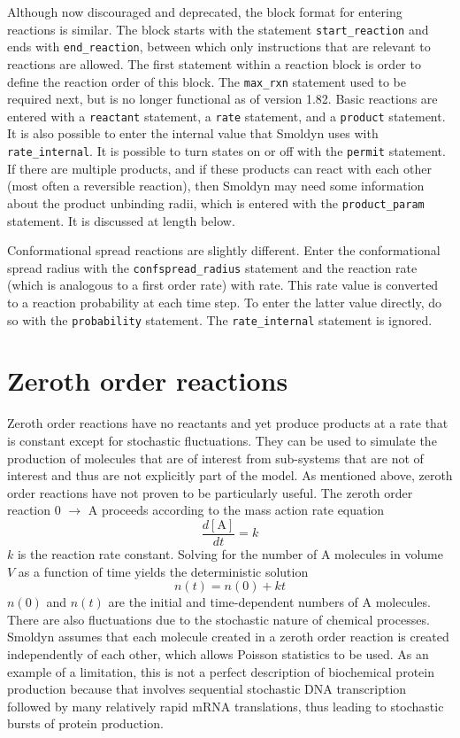 \documentclass {scrbook}
\newcommand {\ttt} {\texttt}
\begin{document}
Although now discouraged and deprecated, the block format for entering reactions is similar. The block starts with the statement \ttt{start\_reaction} and ends with \ttt{end\_reaction}, between which only instructions that are relevant to reactions are allowed. The first statement within a reaction block is order to define the reaction order of this block. The \ttt{max\_rxn} statement used to be required next, but is no longer functional as of version 1.82. Basic reactions are entered with a \ttt{reactant} statement, a \ttt{rate} statement, and a \ttt{product} statement. It is also possible to enter the internal value that Smoldyn uses with \ttt{rate\_internal}. It is possible to turn states on or off with the \ttt{permit} statement. If there are multiple products, and if these products can react with each other (most often a reversible reaction), then Smoldyn may need some information about the product unbinding radii, which is entered with the \ttt{product\_param} statement. It is discussed at length below.

Conformational spread reactions are slightly different. Enter the conformational spread radius with the \ttt{confspread\_radius} statement and the reaction rate (which is analogous to a first order rate) with rate. This rate value is converted to a reaction probability at each time step. To enter the latter value directly, do so with the \ttt{probability} statement. The \ttt{rate\_internal} statement is ignored.

\section{Zeroth order reactions}

Zeroth order reactions have no reactants and yet produce products at a rate that is constant except for stochastic fluctuations. They can be used to simulate the production of molecules that are of interest from sub-systems that are not of interest and thus are not explicitly part of the model. As mentioned above, zeroth order reactions have not proven to be particularly useful.
The zeroth order reaction 0 $\rightarrow$ A proceeds according to the mass action rate equation
$$\frac{d[\textrm{A}]}{dt} = k$$
$k$ is the reaction rate constant. Solving for the number of A molecules in volume $V$ as a function of time yields the deterministic solution
$$n(t) = n(0)+kt$$
$n(0)$ and $n(t)$ are the initial and time-dependent numbers of A molecules. There are also fluctuations due to the stochastic nature of chemical processes. Smoldyn assumes that each molecule created in a zeroth order reaction is created independently of each other, which allows Poisson statistics to be used. As an example of a limitation, this is not a perfect description of biochemical protein production because that involves sequential stochastic DNA transcription followed by many relatively rapid mRNA translations, thus leading to stochastic bursts of protein production.
\end{document}
